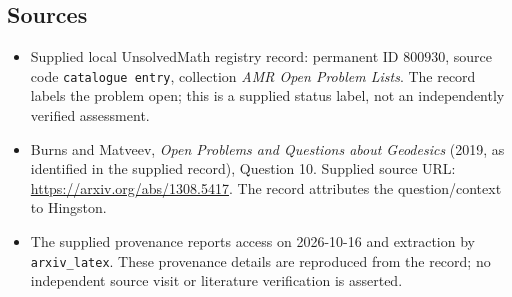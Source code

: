 \documentclass[11pt]{article}
\begin{document}
\subsection{Sources}
\begin{itemize}
\item Supplied local UnsolvedMath registry record: permanent ID \(800930\), source code \texttt{catalogue entry}, collection \emph{AMR Open Problem Lists}. The record labels the problem open; this is a supplied status label, not an independently verified assessment.
\item Burns and Matveev, \emph{Open Problems and Questions about Geodesics} (2019, as identified in the supplied record), Question 10. Supplied source URL: \url{https://arxiv.org/abs/1308.5417}. The record attributes the question/context to Hingston.
\item The supplied provenance reports access on 2026-10-16 and extraction by \texttt{arxiv\_latex}. These provenance details are reproduced from the record; no independent source visit or literature verification is asserted.
\end{itemize}
\end{document}
